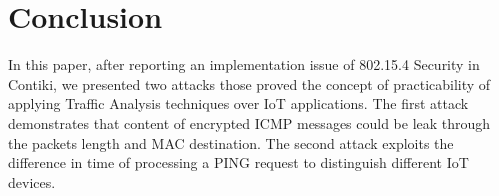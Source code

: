 \section{Conclusion \label{conclusion}}

In this paper, after reporting an implementation issue of 802.15.4 Security in Contiki, we presented two attacks those proved the concept of practicability of applying Traffic Analysis techniques over IoT applications. The first attack demonstrates that content of encrypted ICMP messages could be leak through the packets length and MAC destination. The second attack exploits the difference in time of processing a PING request to distinguish different IoT devices.

